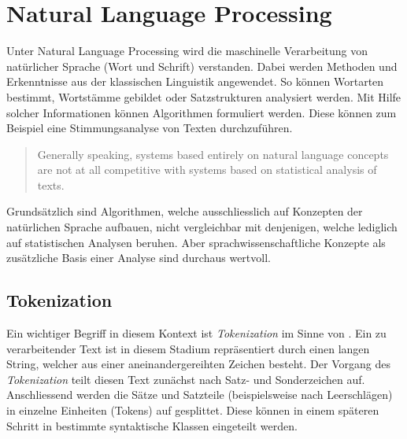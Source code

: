 
\section{\gls{Natural Language Processing}}\label{natural-language-processing}


Unter \gls{Natural Language Processing} wird die maschinelle Verarbeitung von natürlicher Sprache (Wort und Schrift) verstanden. Dabei werden Methoden und Erkenntnisse aus der klassischen \gls{Linguistik} angewendet. So können Wortarten bestimmt, Wortstämme gebildet oder Satzstrukturen analysiert werden. Mit Hilfe solcher Informationen können Algorithmen formuliert werden. Diese können zum Beispiel eine Stimmungsanalyse von Texten durchzuführen. 

\begin{quote}
Generally speaking, systems based entirely on natural language concepts are not at all competitive with systems based on statistical analysis of texts.
\\\cite{kantor2001foundations}\end{quote}

Grundsätzlich sind Algorithmen, welche ausschliesslich auf Konzepten der natürlichen Sprache aufbauen, nicht vergleichbar mit denjenigen, welche lediglich auf statistischen Analysen beruhen. Aber sprachwissenschaftliche Konzepte als zusätzliche Basis einer Analyse sind durchaus wertvoll.


\subsection{Tokenization}\label{tokenization}


Ein wichtiger Begriff in diesem Kontext ist \textit{Tokenization} im Sinne von \cite{grefenstette1994word}. Ein zu verarbeitender Text ist in diesem Stadium repräsentiert durch einen langen String, welcher aus einer aneinandergereihten Zeichen besteht. Der Vorgang des \textit{Tokenization} teilt diesen Text zunächst nach Satz- und Sonderzeichen auf. Anschliessend werden die Sätze und Satzteile (beispielsweise nach Leerschlägen) in einzelne Einheiten (Tokens) auf gesplittet. Diese können in einem späteren Schritt in bestimmte syntaktische Klassen eingeteilt werden.

